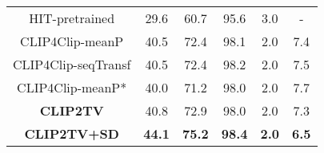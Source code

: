 \begin{table}[t]
\begin{minipage}{0.48\linewidth}
\begin{center}
{\begin{tabular}{c|ccccc}
    HIT-pretrained \cite{liu2021hit} & 29.6 & 60.7 & 95.6 & 3.0 & - \\
    CLIP4Clip-meanP \cite{luo2021clip4clip} & 40.5 & 72.4 & 98.1 & 2.0 & 7.4 \\
    CLIP4Clip-seqTransf \cite{luo2021clip4clip} & 40.5 & 72.4 & 98.2 & 2.0 & 7.5 \\
    CLIP4Clip-meanP* \cite{luo2021clip4clip} & 40.0 & 71.2 & 98.0 & 2.0 & 7.7 \\
    \hline
    \textbf{CLIP2TV} & 40.8 & 72.9 & 98.0 & 2.0 & 7.3 \\
    \textbf{CLIP2TV+SD} & \textbf{44.1} & \textbf{75.2} & \textbf{98.4} & \textbf{2.0} & \textbf{6.5} \\
    \hline
    \end{tabular}}
    \end{center}
    \end{minipage}
\end{table}

\begin{table}[t]
    \begin{center}
    \caption{VATEX. CLIP4Clip-seqTransf* means there are no results about VATEX of HGR split reported in \cite{luo2021clip4clip} and \cite{fang2021clip2video}, so we conduct it by ourselves.}
    \label{tab:vatex}
    \footnotesize
    \end{center}
\end{table}

